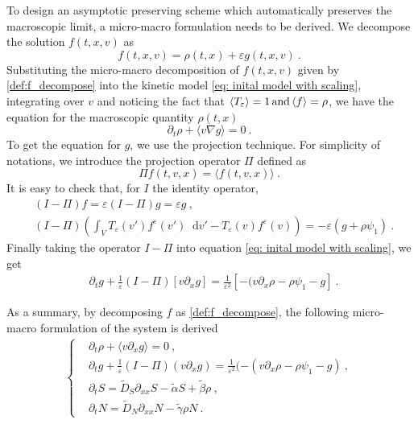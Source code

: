\documentclass[11pt,twoside]{article}
\newcommand*\diff{\mathop{}\!\mathrm{d}}
\begin{document}
To design an asymptotic preserving scheme which automatically preserves the macroscopic limit, a micro-macro formulation needs to be derived. 
We decompose the solution $f(t,x,v)$ as 
\begin{equation}\label{def:f_decompose}
    f(t,x,v) = \rho(t,x) + \varepsilon g(t,x,v)\ .
\end{equation}
Substituting the micro-macro decomposition of $f(t, x, v)$ given by \eqref{def:f_decompose} into the  kinetic model \eqref{eq: inital model with scaling}, integrating over $v$ and noticing the fact that $\langle T_\varepsilon \rangle=1 \, \textnormal{and}\, \langle f\rangle = \rho$, we have the equation for the macroscopic quantity $\rho(t, x)$
\begin{equation*}
    \partial_t \rho +  \langle v \nabla  g\rangle  =  0\ .
\end{equation*}
To get the equation for $g$, we use the projection technique. 
For simplicity of notations, we introduce the projection operator $\Pi$ defined as 
\begin{equation*}
    \Pi f(t,{v},{x}) = \langle f(t,{v},{x})\rangle \ .
\end{equation*}
It is easy to check that, {for $I$ the identity operator,} 
\begin{align*}
    & (I - \Pi) f = \varepsilon(I - \Pi) g = \varepsilon g\ ,\\
    & (I - \Pi) \left(\int_VT_\varepsilon(v')f^\varepsilon(v')\diff v'-T_\varepsilon(v)f^\varepsilon(v)\right) = -\varepsilon\left(g+\rho \psi_1 \right) \ .
\end{align*}
Finally taking the operator $I-\Pi$ into equation \eqref{eq: inital model with scaling}, we get
\begin{align*}
    &\partial_t g + \frac{1}{\varepsilon} (I-\Pi)\left[v \partial_x g \right] 
    = \frac{1}{\varepsilon^2}\left[-(v\partial_x\rho-\rho \psi_1  - g\right] \ .
\end{align*}

As a summary, by decomposing $f$ as \eqref{def:f_decompose}, the following micro-macro formulation of the system is derived
\begin{align}\label{eq:macro_micro}
\begin{cases}
	&\partial_t \rho +  \langle v\partial_x g\rangle  = 0\ , \\
	&\partial_t g + \frac{1}{\varepsilon} (I-\Pi) ({v}\partial_x g) = \frac{1}{\varepsilon^2}(-({v}\partial_x \rho-\rho\psi_1 -  g) \ ,\\
	&  \partial_t S = \tilde{D}_S\partial_{xx} S -\tilde{\alpha}S+\tilde{\beta}\rho\ ,\\
 & \partial_tN = \tilde{D}_N\partial_{xx} N-\tilde{\gamma}\rho N\ .
\end{cases}
\end{align}
\end{document}
